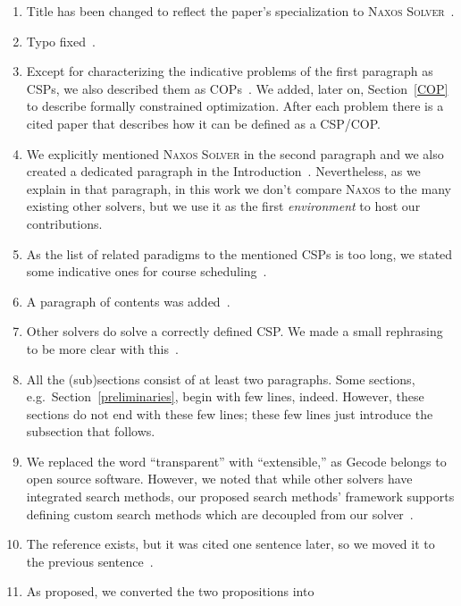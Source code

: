 \documentclass{ws-ijait}
\begin{document}
\begin{enumerate}
  \item Title has been changed to reflect the paper's
        specialization to \textsc{Naxos
        Solver}~.
  \item Typo fixed~.
  \item Except for characterizing the indicative problems of
        the first paragraph as CSPs, we also described them
        as COPs~. We added, later on,
        Section~\ref{COP} to describe formally constrained
        optimization. After each problem there is a cited
        paper that describes how it can be defined as a
        CSP\slash COP.
  \item We explicitly mentioned \textsc{Naxos Solver} in the
        second paragraph and we also created a dedicated
        paragraph in the Introduction~.
        Nevertheless, as we explain in that paragraph, in
        this work we don't compare \textsc{Naxos} to the
        many existing other solvers, but we use it as the
        first \emph{environment} to host our contributions.
  \item As the list of related paradigms to the mentioned
        CSPs is too long, we stated some indicative ones for
        course scheduling~.
  \item A paragraph of contents was added~.
  \item Other solvers do solve a correctly defined CSP. We
        made a small rephrasing to be more clear with
        this~.
  \item All the (sub)sections consist of at least two
        paragraphs. Some sections, e.g.\ 
        Section~\ref{preliminaries}, begin with few lines,
        indeed. However, these sections do not end with
        these few lines; these few lines just introduce the
        subsection that follows.
  \item We replaced the word ``transparent'' with
        ``extensible,'' as Gecode belongs to open source
        software. However, we noted that while other solvers
        have integrated search methods, our proposed search
        methods' framework supports defining custom search
        methods which are decoupled from our
        solver~.
  \item The reference exists, but it was cited one sentence
        later, so we moved it to the previous
        sentence~.
  \item As proposed, we converted the two propositions into

\end{enumerate}
\end{document}
